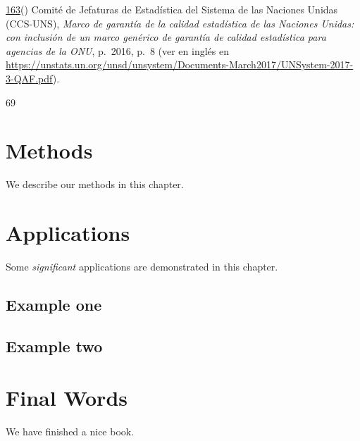 \documentclass[
]{book}
\begin{document}
\protect\hyperlink{sdfootnote163anc}{163}() Comité de Jefaturas de Estadística del Sistema de las Naciones Unidas (CCS-UNS), \emph{Marco de garantía de la calidad estadística de las Naciones Unidas: con inclusión de un marco genérico de garantía de calidad estadística para agencias de la ONU}, p.~2016, p.~8 (ver en inglés en \url{https://unstats.un.org/unsd/unsystem/Documents-March2017/UNSystem-2017-3-QAF.pdf}).

69

\hypertarget{methods}{%
\chapter{Methods}\label{methods}}

We describe our methods in this chapter.

\hypertarget{applications}{%
\chapter{Applications}\label{applications}}

Some \emph{significant} applications are demonstrated in this chapter.

\hypertarget{example-one}{%
\section{Example one}\label{example-one}}

\hypertarget{example-two}{%
\section{Example two}\label{example-two}}

\hypertarget{final-words}{%
\chapter{Final Words}\label{final-words}}

We have finished a nice book.

  
\end{document}
